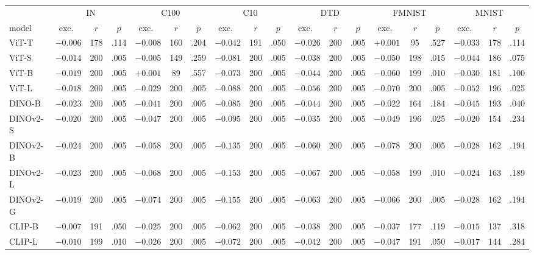 \begin{table}[H]
\centering
\scriptsize
\setlength{\tabcolsep}{1.8pt}
\begin{tabular}{lcccccccccccccccccc}
\toprule
 & \multicolumn{3}{c}{IN} & \multicolumn{3}{c}{C100} & \multicolumn{3}{c}{C10} & \multicolumn{3}{c}{DTD} & \multicolumn{3}{c}{FMNIST} & \multicolumn{3}{c}{MNIST} \\
model & exc.\ & $r$ & $p$ & exc.\ & $r$ & $p$ & exc.\ & $r$ & $p$ & exc.\ & $r$ & $p$ & exc.\ & $r$ & $p$ & exc.\ & $r$ & $p$ \\
\midrule
ViT-T & $-0.006$ & 178 & .114 & $-0.008$ & 160 & .204 & $-0.042$ & 191 & .050 & $-0.026$ & 200 & .005 & $+0.001$ & 95 & .527 & $-0.033$ & 178 & .114 \\
ViT-S & $-0.014$ & 200 & .005 & $-0.005$ & 149 & .259 & $-0.081$ & 200 & .005 & $-0.038$ & 200 & .005 & $-0.050$ & 198 & .015 & $-0.044$ & 186 & .075 \\
ViT-B & $-0.019$ & 200 & .005 & $+0.001$ & 89 & .557 & $-0.073$ & 200 & .005 & $-0.044$ & 200 & .005 & $-0.060$ & 199 & .010 & $-0.030$ & 181 & .100 \\
ViT-L & $-0.018$ & 200 & .005 & $-0.029$ & 200 & .005 & $-0.088$ & 200 & .005 & $-0.056$ & 200 & .005 & $-0.070$ & 200 & .005 & $-0.052$ & 196 & .025 \\
\midrule
DINO-B & $-0.023$ & 200 & .005 & $-0.041$ & 200 & .005 & $-0.085$ & 200 & .005 & $-0.044$ & 200 & .005 & $-0.022$ & 164 & .184 & $-0.045$ & 193 & .040 \\
DINOv2-S & $-0.020$ & 200 & .005 & $-0.047$ & 200 & .005 & $-0.095$ & 200 & .005 & $-0.035$ & 200 & .005 & $-0.049$ & 196 & .025 & $-0.020$ & 154 & .234 \\
DINOv2-B & $-0.024$ & 200 & .005 & $-0.058$ & 200 & .005 & $-0.135$ & 200 & .005 & $-0.060$ & 200 & .005 & $-0.078$ & 200 & .005 & $-0.028$ & 162 & .194 \\
DINOv2-L & $-0.023$ & 200 & .005 & $-0.068$ & 200 & .005 & $-0.153$ & 200 & .005 & $-0.067$ & 200 & .005 & $-0.058$ & 199 & .010 & $-0.024$ & 163 & .189 \\
DINOv2-G & $-0.019$ & 200 & .005 & $-0.074$ & 200 & .005 & $-0.155$ & 200 & .005 & $-0.063$ & 200 & .005 & $-0.066$ & 200 & .005 & $-0.028$ & 162 & .194 \\
\midrule
CLIP-B & $-0.007$ & 191 & .050 & $-0.025$ & 200 & .005 & $-0.062$ & 200 & .005 & $-0.038$ & 200 & .005 & $-0.037$ & 177 & .119 & $-0.015$ & 137 & .318 \\
CLIP-L & $-0.010$ & 199 & .010 & $-0.026$ & 200 & .005 & $-0.072$ & 200 & .005 & $-0.042$ & 200 & .005 & $-0.047$ & 191 & .050 & $-0.017$ & 144 & .284 \\

\end{tabular}
\end{table}
